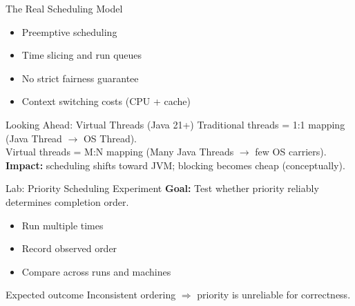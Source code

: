 \documentclass[aspectratio=169,11pt]{beamer}
\begin{document}
	\begin{frame}{The Real Scheduling Model}
		\begin{itemize}
			\item Preemptive scheduling
			\item Time slicing and run queues
			\item No strict fairness guarantee
			\item Context switching costs (CPU + cache)
		\end{itemize}
		
		\vspace{3mm}
		\begin{block}{Looking Ahead: Virtual Threads (Java 21+)}
			\footnotesize
			Traditional threads = 1:1 mapping (Java Thread $\rightarrow$ OS Thread).\\
			Virtual threads = M:N mapping (Many Java Threads $\rightarrow$ few OS carriers).\\
			\textbf{Impact:} scheduling shifts toward JVM; blocking becomes cheap (conceptually).
		\end{block}
	\end{frame}
	
	
	\begin{frame}{Lab: Priority Scheduling Experiment}
		\textbf{Goal:} Test whether priority reliably determines completion order.
		
		\vspace{3mm}
		\begin{itemize}
			\item Run multiple times
			\item Record observed order
			\item Compare across runs and machines
		\end{itemize}
		
		\vspace{3mm}
		\begin{block}{Expected outcome}
			Inconsistent ordering $\Rightarrow$ priority is unreliable for correctness.
		\end{block}
	\end{frame}
	
\end{document}
